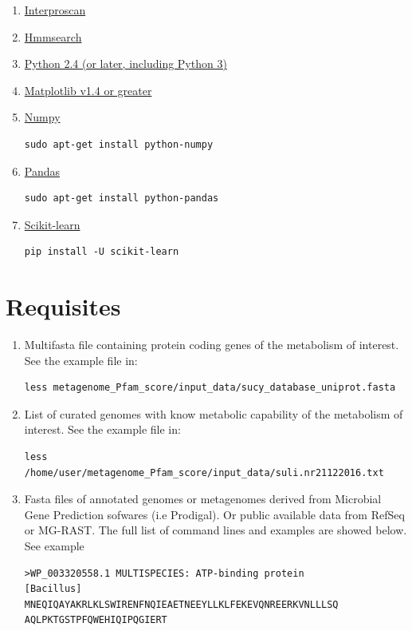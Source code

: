 \documentclass[12pt]{report}
\begin{document}
\begin{enumerate}
\item{\href{https://www.ebi.ac.uk/interpro/interproscan.htm}{Interproscan}}
\item{ \href{http://hmmer.org/}{Hmmsearch}}

\item{\href{https://www.python.org/downloads/}{Python 2.4 (or later, including Python 3)
    }}

\item{\href{http://matplotlib.org/users/installing.html#most-platforms-
scientific-python-distributions}{Matplotlib v1.4 or greater}}

\item{\href{https://docs.scipy.org
/doc/numpy-1.10.0/user/install.html}{Numpy}}
\begin{verbatim}
sudo apt-get install python-numpy 
\end{verbatim}
\item{\href{http://pandas.pydata.org
/pandas-docs/stable/install.html}{Pandas}}
\begin{verbatim}
sudo apt-get install python-pandas 
\end{verbatim}
\item{\href{http://scikit-learn.org/stable/install.html}{Scikit-learn}}
\begin{verbatim}
pip install -U scikit-learn
\end{verbatim}
\end{enumerate}

\section{Requisites}
\begin{enumerate}

\item Multifasta file containing protein coding genes of the metabolism of interest. See the example file in: 
\begin{verbatim}
less metagenome_Pfam_score/input_data/sucy_database_uniprot.fasta
\end{verbatim}

\item List of curated genomes with know metabolic capability of the metabolism of interest.  See the example file in: 
\begin{verbatim}
less /home/user/metagenome_Pfam_score/input_data/suli.nr21122016.txt
\end{verbatim}

\item Fasta files of annotated genomes or metagenomes derived from Microbial Gene Prediction sofwares (i.e Prodigal). Or public available data from RefSeq or MG-RAST. The full list of command lines and examples are showed below. See example
\begin{verbatim}
>WP_003320558.1 MULTISPECIES: ATP-binding protein 
[Bacillus]
MNEQIQAYAKRLKLSWIRENFNQIEAETNEEYLLKLFEKEVQNREERKVNLLLSQ
AQLPKTGSTPFQWEHIQIPQGIERT
\end{verbatim}
\end{enumerate}
\end{document}
